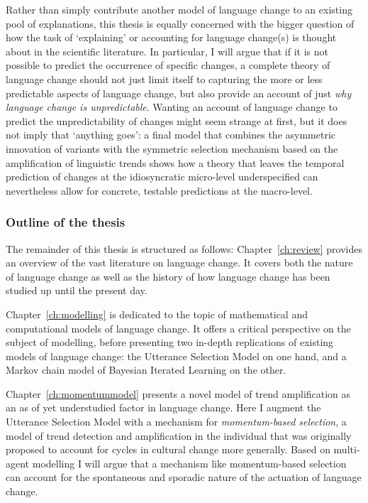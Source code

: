 Rather than simply contribute another model of language change to an existing pool of explanations, this thesis is equally concerned with the bigger question of how the task of `explaining' or accounting for language change(s) is thought about in the scientific literature.
In particular, I will argue that if it is not possible to predict the occurrence of specific changes, a complete theory of language change should not just limit itself to capturing the more or less predictable aspects of language change, but also provide an account of just \emph{why language change is unpredictable}.
Wanting an account of language change to predict the unpredictability of changes might seem strange at first, but it does not imply that `anything goes': a final model that combines the asymmetric innovation of variants with the symmetric selection mechanism based on the amplification of linguistic trends shows how a theory that leaves the temporal prediction of changes at the idiosyncratic micro-level underspecified can nevertheless allow for concrete, testable predictions at the macro-level. %


\subsubsection{Outline of the thesis}

The remainder of this thesis is structured as follows: Chapter~\ref{ch:review} provides an overview of the vast literature on language change. It covers both the nature of language change as well as the history of how language change has been studied up until the present day. %

Chapter~\ref{ch:modelling} is dedicated to the topic of mathematical and computational models of language change. It offers a critical perspective on the subject of modelling, before presenting two in-depth replications of existing models of language change: the Utterance Selection Model on one hand, and a Markov chain model of Bayesian Iterated Learning on the other.

Chapter~\ref{ch:momentummodel} presents a novel model of trend amplification as an as of yet understudied factor in language change. Here I augment the Utterance Selection Model with a mechanism for \emph{momentum-based selection}, a model of trend detection and amplification in the individual that was originally proposed to account for cycles in cultural change more generally. Based on multi-agent modelling I will argue that a mechanism like momentum-based selection can account for the spontaneous and sporadic nature of the actuation of language change.

